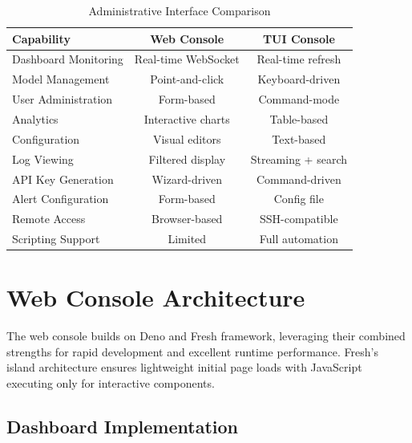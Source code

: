 \documentclass[12pt,a4paper,twoside]{report}
\begin{document}
\begin{table}[h]
\centering
\begin{tabular}{@{}p{4cm}cc@{}}
\toprule
\textbf{Capability} & \textbf{Web Console} & \textbf{TUI Console} \\
\midrule
Dashboard Monitoring & Real-time WebSocket & Real-time refresh \\
Model Management & Point-and-click & Keyboard-driven \\
User Administration & Form-based & Command-mode \\
Analytics & Interactive charts & Table-based \\
Configuration & Visual editors & Text-based \\
Log Viewing & Filtered display & Streaming + search \\
API Key Generation & Wizard-driven & Command-driven \\
Alert Configuration & Form-based & Config file \\
Remote Access & Browser-based & SSH-compatible \\
Scripting Support & Limited & Full automation \\
\bottomrule
\end{tabular}
\caption{Administrative Interface Comparison}
\label{tab:interface-comparison}
\end{table}

\section{Web Console Architecture}

The web console builds on Deno and Fresh framework, leveraging their combined strengths for rapid development and excellent runtime performance. Fresh's island architecture ensures lightweight initial page loads with JavaScript executing only for interactive components.

\subsection{Dashboard Implementation}
\end{document}
